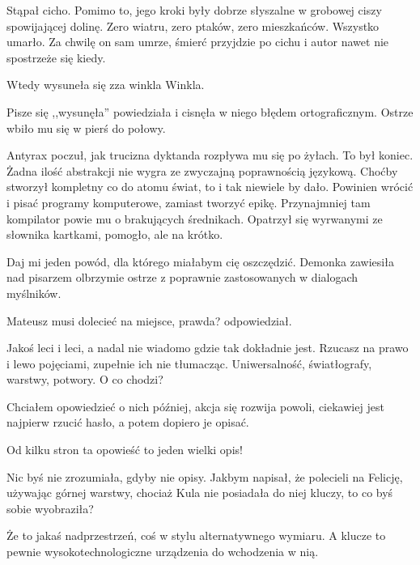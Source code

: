 Stąpał cicho. Pomimo to, jego kroki były dobrze słyszalne w grobowej ciszy spowijającej dolinę.
Zero wiatru, zero ptaków, zero mieszkańców. Wszystko umarło.
Za chwilę on sam umrze, śmierć przyjdzie po cichu i autor nawet nie spostrzeże się kiedy.

Wtedy wysuneła się zza winkla Winkla. 

\ds{} Pisze się ,,wysunęła'' \dm{} powiedziała i cisnęła w niego błędem ortograficznym. Ostrze wbiło mu się w pierś do połowy. \de{}

Antyrax poczuł, jak trucizna dyktanda rozpływa mu się po żyłach. To był koniec. Żadna ilość abstrakcji nie wygra ze zwyczajną poprawnością językową.
Choćby stworzył kompletny co do atomu świat, to i tak niewiele by dało. 
Powinien wrócić i pisać programy komputerowe, zamiast tworzyć epikę. Przynajmniej tam kompilator powie mu o brakujących średnikach.
Opatrzył się wyrwanymi ze słownika kartkami, pomogło, ale na krótko.

\ds{} Daj mi jeden powód, dla którego miałabym cię oszczędzić. \dm{} Demonka zawiesiła nad pisarzem olbrzymie ostrze z poprawnie zastosowanych w dialogach myślników. \de{}

\ds{} Mateusz musi dolecieć na miejsce, prawda? \dm{} odpowiedział. \de{}

\ds{} Jakoś leci i leci, a nadal nie wiadomo gdzie tak dokładnie jest. Rzucasz na prawo i lewo pojęciami, zupełnie ich nie tłumacząc.
Uniwersalność, światłografy, warstwy, potwory. O co chodzi? \de{}

\ds{} Chciałem opowiedzieć o nich później, akcja się rozwija powoli, ciekawiej jest najpierw rzucić hasło, a potem dopiero je opisać. \de{}

\ds{} Od kilku stron ta opowieść to jeden wielki opis! \de{}

\ds{} Nic byś nie zrozumiała, gdyby nie opisy. Jakbym napisał, że polecieli na Felicję, używając górnej warstwy, chociaż Kula nie posiadała do niej kluczy, to co byś sobie wyobraziła? \de{}

\ds{} Że to jakaś nadprzestrzeń, coś w stylu alternatywnego wymiaru. A klucze to pewnie wysokotechnologiczne urządzenia do wchodzenia w nią. \de{}

